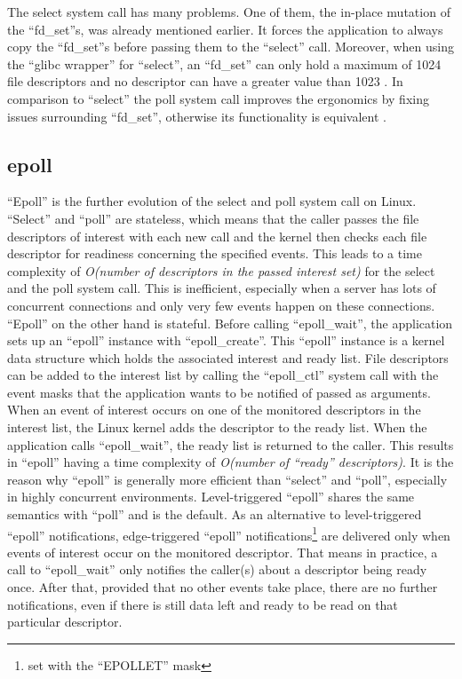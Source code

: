 The select system call has many problems. One of them, the in-place mutation of the “fd\_set”s, was already mentioned earlier. It forces the application to always copy the “fd\_set”s before passing them to the “select” call. Moreover, when using the “glibc wrapper” for “select”, an “fd\_set” can only hold a maximum of 1024 file descriptors and no descriptor can have a greater value than 1023 \cite{man:select}. \newline
In comparison to “select” the poll system call improves the ergonomics by fixing issues surrounding “fd\_set”, otherwise its functionality is equivalent \cite{man:poll}.

\subsection{epoll}
“Epoll” is the further evolution of the select and poll system call on Linux.
“Select” and “poll” are stateless, which means that the caller passes the file descriptors of interest with each new call and the kernel then checks each file descriptor for readiness concerning the specified events. This leads to a time complexity of \textit{O(number of descriptors in the passed interest set)} for the select and the poll system call. This is inefficient, especially when a server has lots of concurrent connections and only very few events happen on these connections. \newline
“Epoll” on the other hand is stateful. Before calling “epoll\_wait”, the application sets up an “epoll” instance with “epoll\_create”. This “epoll” instance is a kernel data structure which holds the associated interest and ready list. File descriptors can be added to the interest list by calling the “epoll\_ctl” system call with the event masks that the application wants to be notified of passed as arguments. When an event of interest occurs on one of the monitored descriptors in the interest list, the Linux kernel adds the descriptor to the ready list. When the application calls “epoll\_wait”, the ready list is returned to the caller. This results in “epoll” having a time complexity of \textit{O(number of “ready” descriptors)}. It is the reason why “epoll” is generally more efficient than “select” and “poll”, especially in highly concurrent environments. \newline
Level-triggered “epoll” shares the same semantics with “poll” and is the default.
As an alternative to level-triggered “epoll” notifications, edge-triggered “epoll” notifications\footnote{set with the “EPOLLET” mask} are delivered only when events of interest occur on the monitored descriptor. That means in practice, a call to “epoll\_wait” only notifies the caller(s) about a descriptor being ready once. After that, provided that no other events take place, there are no further notifications, even if there is still data left and ready to be read on that particular descriptor. 
